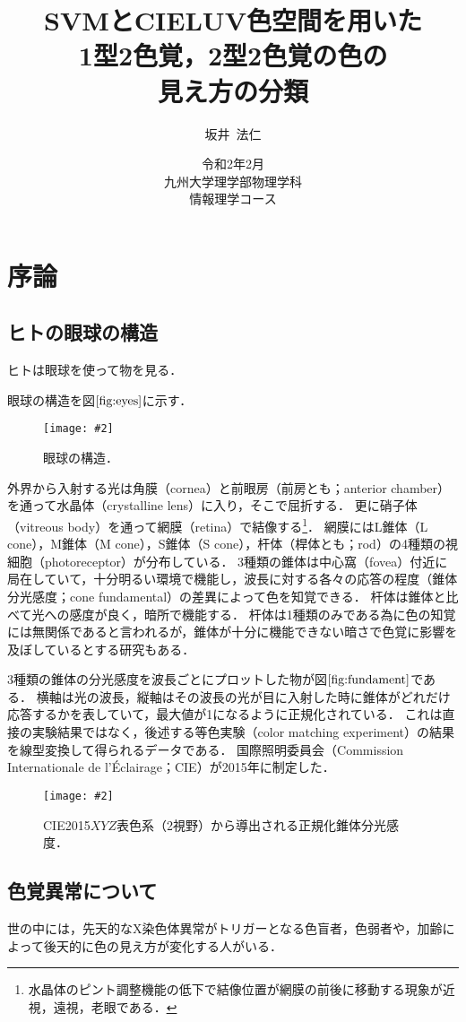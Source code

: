\documentclass[uplatex,paper=a4,fontsize=4.0truemm,jafontsize=4.0truemm,head_space=30.0truemm,foot_space=30.0truemm,baselineskip=8.0truemm,line_length=40zw,gutter=25.0truemm,oneside,openany,fleqn,hanging_panctuation,open_bracket_pos=nibu_tentsuki,dvipdfmx,jis2004,book,titlepage]{jlreq}
\title{\vspace{-25truemm}\Huge{SVMとCIELUV色空間を用いた\\1型2色覚，2型2色覚の色の\\見え方の分類}\vspace{55truemm}}
\author{\huge{坂井~法仁}}
\date{\LARGE{令和2年2月}\\ \vspace{30truemm}\LARGE{九州大学理学部物理学科\\ 情報理学コース}}
\theoremstyle{mystyle}
\newcommand{\captiondot}[1]{\caption{#1．}}
\newcommand{\figureinput}[4]{\begin{figure}[tbp]\centering\texttt{[image: \#2]}\captiondot{#3}\label{fig:#4}\end{figure}}
\newcommand{\mathdisplaystyle}[1]{\(\displaystyle{#1}\)}
\newcommand{\Reference}[1]{\mathdisplaystyle{\ref{#1}}}
\begin{document}
	\maketitle
	\tableofcontents
	\clearpage
	\setcounter{page}{1}
	\chapter{序論}\label{chap:intro}
		\section{ヒトの眼球の構造}
			ヒトは眼球を使って物を見る．

			眼球の構造を図\Reference{fig:eyes}に示す．
			\figureinput{width=9.5truecm}{D:/a/figs/eye2.png}{眼球の構造\protect\cite[p.~109]{Sotoyama1985}}{eyes}
			外界から入射する光は角膜（cornea）と前眼房（前房とも；anterior chamber）を通って水晶体（crystalline lens）に入り，そこで屈折する．
			更に硝子体（vitreous body）を通って網膜（retina）で結像する\footnote{水晶体のピント調整機能の低下で結像位置が網膜の前後に移動する現象が近視，遠視，老眼である．}．
			網膜にはL錐体（L cone），M錐体（M cone），S錐体（S cone），杆体（桿体とも；rod）の4種類の視細胞（photoreceptor）が分布している．
			3種類の錐体は中心窩（fovea）付近に局在していて，十分明るい環境で機能し，波長に対する各々の応答の程度（錐体分光感度；cone fundamental）の差異によって色を知覚できる．
			杆体は錐体と比べて光への感度が良く，暗所で機能する\cite{Hosoki2014}．
			杆体は1種類のみである為に色の知覚には無関係であると言われるが，錐体が十分に機能できない暗さで色覚に影響を及ぼしているとする研究もある\cite{Takeshita2014}．

			3種類の錐体の分光感度を波長ごとにプロットした物が図\Reference{fig:fundament}である．
			横軸は光の波長，縦軸はその波長の光が目に入射した時に錐体がどれだけ応答するかを表していて，最大値が1になるように正規化されている．
			これは直接の実験結果ではなく，後述する等色実験（color matching experiment）の結果を線型変換して得られるデータである．
			国際照明委員会（Commission Internationale de l'Éclairage；CIE）が2015年に制定した．
			\figureinput{width=\linewidth}{D:/a/figs/ConeFundamental.png}{CIE2015\mathdisplaystyle{XYZ}表色系（2\textdegree 視野）から導出される正規化錐体分光感度}{fundament}
		\section{色覚異常について}
			世の中には，先天的なX染色体異常がトリガーとなる色盲者\cite{Okabe2002a}，色弱者\cite{Sunaga2017}や，加齢によって後天的に色の見え方が変化する人\cite{Kuriki2000}がいる．
\end{document}

